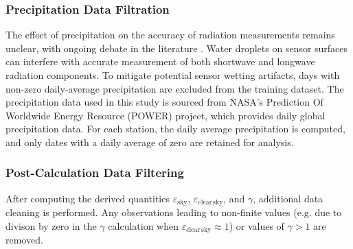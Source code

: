 \documentclass[preprint,12pt]{elsarticle}
\begin{document}
\subsubsection{Precipitation Data Filtration}
The effect of precipitation on the accuracy of radiation measurements remains unclear, with ongoing debate in the literature \citep{xu2014effect,wang2025rain}. Water droplets on sensor surfaces can interfere with accurate measurement of both shortwave and longwave radiation components. To mitigate potential sensor wetting artifacts, days with non-zero daily-average precipitation are excluded from the training dataset. The precipitation data used in this study is sourced from NASA's Prediction Of Worldwide Energy Resource (POWER) project, which provides daily global precipitation data. For each station, the daily average precipitation is computed, and only dates with a daily average of zero are retained for analysis.


\subsubsection{Post-Calculation Data Filtering}

After computing the derived quantities $\varepsilon_{\mathrm{sky}}$, $\varepsilon_{\mathrm{clear\,sky}}$, and $\gamma$, additional data cleaning is performed. Any observations leading to non-finite values (e.g. due to divison by zero in the $\gamma$ calculation when $\varepsilon_{\mathrm{clear\,sky}} \approx 1$) or values of $\gamma > 1$ are removed. %
\end{document}
